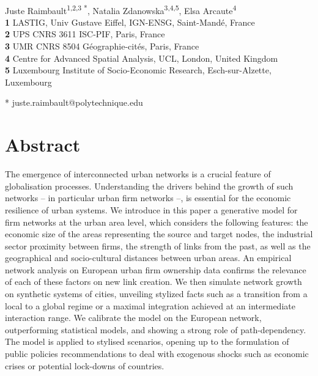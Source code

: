 \documentclass[10pt,letterpaper]{article}
\begin{document}
\justify
\vspace*{0.2in}

\begin{flushleft}
{\Large
\textbf{}
}
\newline

\\
Juste Raimbault\textsuperscript{1,2,3 *},
Natalia Zdanowska\textsuperscript{3,4,5},
Elsa Arcaute\textsuperscript{4}
\\
\bigskip
\textbf{1} LASTIG, Univ Gustave Eiffel, IGN-ENSG, Saint-Mand{\'e}, France
\\
\textbf{2} UPS CNRS 3611 ISC-PIF, Paris, France
\\
\textbf{3} UMR CNRS 8504 G{\'e}ographie-cit{\'e}s, Paris, France
\\
\textbf{4} Centre for Advanced Spatial Analysis, UCL, London, United Kingdom
\\
\textbf{5} Luxembourg Institute of Socio-Economic Research, Esch-sur-Alzette, Luxembourg

\bigskip

* juste.raimbault@polytechnique.edu

\end{flushleft}


\section*{Abstract}
The emergence of interconnected urban networks is a crucial feature of globalisation processes. Understanding the drivers behind the growth of such networks -- in particular urban firm networks --, is essential for the economic resilience of urban systems. We introduce in this paper a generative model for firm networks at the urban area level, which considers the following features: the economic size of the areas representing the source and target nodes, the industrial sector proximity between firms, the strength of links from the past, as well as the geographical and socio-cultural distances between urban areas. An empirical network analysis on European urban firm ownership data confirms the relevance of each of these factors on new link creation. We then simulate network growth on synthetic systems of cities, unveiling stylized facts such as a transition from a local to a global regime or a maximal integration achieved at an intermediate interaction range. We calibrate the model on the European network, outperforming statistical models, and showing a strong role of path-dependency. The model is applied to stylised scenarios, opening up to the formulation of public policies recommendations to deal with exogenous shocks such as economic crises or potential lock-downs of countries.
\end{document}
